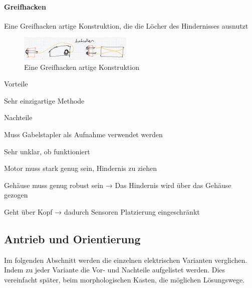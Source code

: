 \documentclass[../main.tex]{subfiles}
\begin{document}
\paragraph{Greifhacken}
Eine Greifhacken artige Konstruktion, die die Löcher des Hindernisses ausnutzt

\begin{figure}[h!]
        \centering
        \includegraphics[width=0.48\textwidth]{img/technologierecherche/Rotation/harponne.jpg}
        \caption{Eine Greifhacken artige Konstruktion}
        \label{img:tech_harponne}
\end{figure}

\begin{minipage}[t]{0.48\textwidth}
    \begin{items}
          \item [Vorteile]
          \item Sehr einzigartige Methode
    \end{items}
\end{minipage}
\hfill
\begin{minipage}[t]{0.48\textwidth}
    \begin{items}
          \item [Nachteile]
          \item Muss Gabelstapler als Aufnahme verwendet werden
          \item Sehr unklar, ob funktioniert
          \item Motor muss stark genug sein, Hindernis zu ziehen
          \item Gehäuse muss genug robust sein → Das Hindernis wird über das Gehäuse gezogen
          \item Geht über Kopf → dadurch Sensoren Platzierung eingeschränkt
    \end{items}
\end{minipage}
\newpage
\subsection{Antrieb und Orientierung}
Im folgenden Abschnitt werden die einzelnen elektrischen Varianten verglichen. Indem zu jeder Variante die Vor- und Nachteile aufgelistet werden. Dies vereinfacht später, beim morphologischen Kasten, die möglichen Lösungswege.
\end{document}
